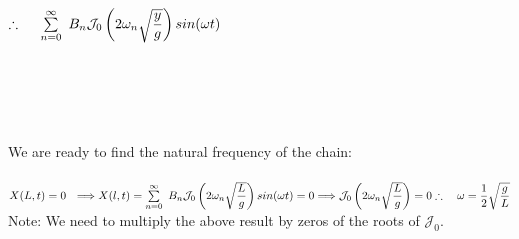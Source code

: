 \documentclass[fleqn]{article}
\begin{document}
\begin{enumerate}
\begin{enumerate}
{          \\
          \\
          $
            \therefore ~~~~ \sum\limits_{n=0}^{\infty} ~ B_n \mathcal{J}_0 \left(2 \omega_n \sqrt{\dfrac{y}{g}}\right) sin(\omega t) \\ \\
          $
          \\
          \\
          \\
          \\
          \\
          \\
          We are ready to find the natural frequency of the chain: \\
          \\
          $
            X(L,t)=0 ~~ \Longrightarrow X(l,t)=\sum\limits_{n=0}^{\infty} ~ B_n \mathcal{J}_0 \left(2 \omega_n \sqrt{\dfrac{L}{g}}\right) sin(\omega t)=0 \Longrightarrow \mathcal{J}_0 \left(2 \omega_n \sqrt{\dfrac{L}{g}}\right)=0 \\
            \\
            \\
            \\
            \therefore ~~~ \omega=\dfrac{1}{2} \sqrt{\dfrac{g}{L}}  \\ \\
          $
          Note: We need to multiply the above result by zeros of the roots of $\mathcal{J}_0$.
        }

    \end{enumerate}
    
    
  \end{enumerate}

  \pagebreak
\end{document}
